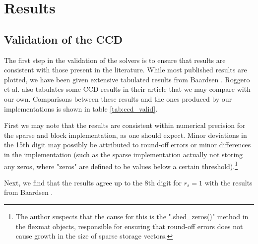 
\chapter{Results} %

\label{Chapter8} %



\section{Validation of the CCD}

The first step in the validation of the solvers is to ensure that results are consistent with those present in the literature. While most published results are plotted, we have been given extensive tabulated results from Baardsen \cite{Baardsen2014,Baardsen2015}.  Roggero et al. also tabulates some CCD results in their article \cite{Roggero2013} that we may compare with our own. Comparisons between these results and the ones produced by our implementations is shown in table \ref{tab:ccd_valid}.

First we may note that the results are consistent within numerical precision for the sparse and block implementation, as one should expect. Minor deviations in the 15th digit may possibly be attributed to round-off errors or minor differences in the implementation (such as the sparse implementation actually not storing any zeros, where "zeros" are defined to be values below a certain threshold).\footnote{The author suspects that the cause for this is the ".shed\_zeros()" method in the flexmat objects, responsible for ensuring that round-off errors does not cause growth in the size of sparse storage vectors.}

Next, we find that the results agree up to the 8th digit for $r_s = 1$ with the results from Baardsen \cite{Baardsen2015}.


